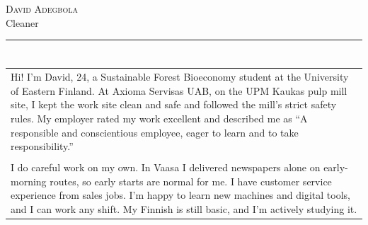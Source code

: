 \documentclass[a4paper,11pt]{article}
\begin{document}
\small
\setlength{\cvlabelw}{3.9cm}
\titlespacing{\section}{0pt}{0.55em}{2pt}

\begin{cvheader}
\par{\centering
		{\Huge \textsc{David Adegbola}}\\[0.4em]
		{\Large Cleaner}
	\bigskip\par}

\hrule
\vspace{0.5em}
\end{cvheader}

\section{}
\begin{tabular}{p{}}
 Hi! I'm David, 24, a Sustainable Forest Bioeconomy student at the University of Eastern Finland. At Axioma Servisas UAB, on the UPM Kaukas pulp mill site, I kept the work site clean and safe and followed the mill's strict safety rules. My employer rated my work excellent and described me as ``A responsible and conscientious employee, eager to learn and to take responsibility.''\\\\

 I do careful work on my own. In Vaasa I delivered newspapers alone on early-morning routes, so early starts are normal for me. I have customer service experience from sales jobs. I'm happy to learn new machines and digital tools, and I can work any shift. My Finnish is still basic, and I'm actively studying it.
\end{tabular}

\section{}
\end{document}
